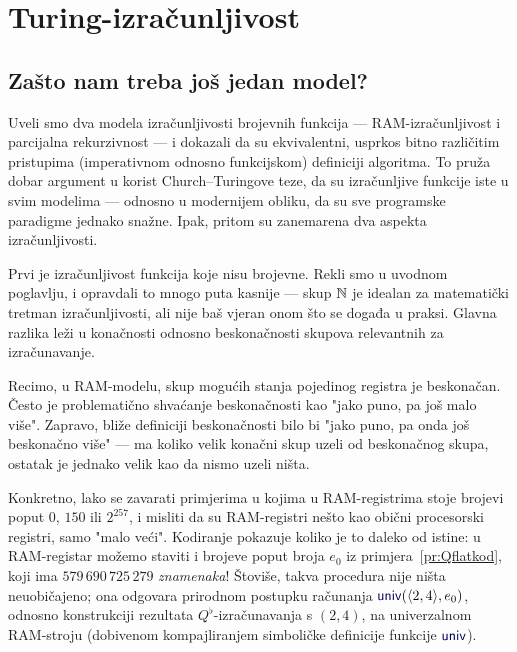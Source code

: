 \chapter{Turing-izračunljivost}\label{ch:Turing}

\section{Zašto nam treba još jedan model?}

Uveli smo dva modela izračunljivosti brojevnih funkcija --- RAM-izračunljivost i parcijalna rekurzivnost --- i dokazali da su ekvivalentni, usprkos bitno različitim pristupima (imperativnom odnosno funkcijskom) definiciji algoritma. To pruža dobar argument u korist Church--\!Turingove teze, da su izračunljive funkcije iste u svim modelima --- odnosno u modernijem obliku, da su sve programske paradigme jednako snažne. Ipak, pritom su zanemarena dva aspekta izračunljivosti.


Prvi je izračunljivost funkcija koje nisu brojevne. Rekli smo u uvodnom poglavlju, i opravdali to mnogo puta kasnije --- skup ${\mathbb N}$ je idealan za matematički tretman izračunljivosti, ali nije baš vjeran onom što se događa u praksi. Glavna razlika leži u konačnosti odnosno beskonačnosti skupova relevantnih za izračunavanje.

Recimo, u RAM-modelu, skup mogućih stanja pojedinog registra je beskonačan. Često je problematično shvaćanje beskonačnosti kao "jako puno, pa još malo više". Zapravo, bliže definiciji beskonačnosti bilo bi "jako puno, pa onda još beskonačno više" --- ma koliko velik konačni skup uzeli od beskonačnog skupa, ostatak je jednako velik kao da nismo uzeli ništa.

Konkretno, lako se zavarati primjerima u kojima u RAM-registrima stoje brojevi poput $0$, $150$ ili $2^{257}$, i misliti da su RAM-registri nešto kao obični procesorski registri, samo "malo veći". Kodiranje pokazuje koliko je to daleko od istine: u RAM-registar možemo staviti i brojeve poput broja $e_0$ iz primjera~\ref{pr:Qflatkod}, koji ima $579\,690\,725\,279$ \emph{znamenaka}! Štoviše, takva procedura nije ništa neuobičajeno; ona odgovara prirodnom postupku računanja $\f{univ}(\kr{2,4},e_0)$, odnosno konstrukciji rezultata $Q^\flat$-izračunavanja s $(2,4)$, na univerzalnom RAM-stroju (dobivenom kompajliranjem simboličke definicije funkcije $\f{univ}$).

